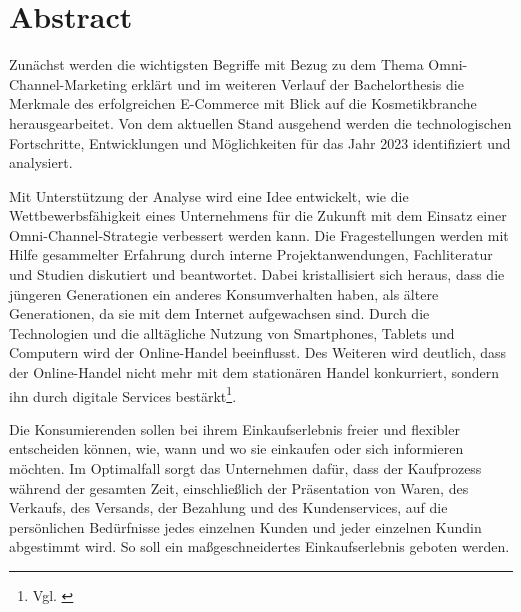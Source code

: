 \section*{Abstract}\label{abstract}

Zunächst werden die wichtigsten Begriffe mit Bezug zu dem Thema Omni-Channel-Marketing erklärt und im weiteren Verlauf der Bachelorthesis die Merkmale des erfolgreichen E-Commerce mit Blick auf die Kosmetikbranche herausgearbeitet.
Von dem aktuellen Stand ausgehend werden die technologischen Fortschritte, Entwicklungen und Möglichkeiten für das Jahr 2023 identifiziert und analysiert.
\newline

Mit Unterstützung der Analyse wird eine Idee entwickelt, wie die Wettbewerbsfähigkeit eines Unternehmens für die Zukunft mit dem Einsatz einer Omni-Channel-Strategie verbessert werden kann. Die Fragestellungen werden mit Hilfe gesammelter Erfahrung durch interne Projektanwendungen, Fachliteratur und Studien diskutiert und beantwortet. Dabei kristallisiert sich heraus, dass die jüngeren Generationen ein anderes Konsumverhalten haben, als ältere Generationen, da sie mit dem Internet aufgewachsen sind. Durch die Technologien und die alltägliche Nutzung von Smartphones, Tablets und Computern wird der Online-Handel beeinflusst. Des Weiteren wird deutlich, dass der Online-Handel nicht mehr mit dem stationären Handel konkurriert, sondern ihn durch digitale Services bestärkt\footnote{Vgl. \autocite [S.43] {Buss2021}}.
\newline

Die Konsumierenden sollen bei ihrem Einkaufserlebnis freier und flexibler entscheiden können, wie, wann und wo sie einkaufen oder sich informieren möchten. Im Optimalfall sorgt das Unternehmen dafür, dass der Kaufprozess während der gesamten Zeit, einschließlich der Präsentation von Waren, des Verkaufs, des Versands, der Bezahlung und des Kundenservices, auf die persönlichen Bedürfnisse jedes einzelnen Kunden und jeder einzelnen Kundin abgestimmt wird. So soll ein maßgeschneidertes Einkaufserlebnis geboten werden.